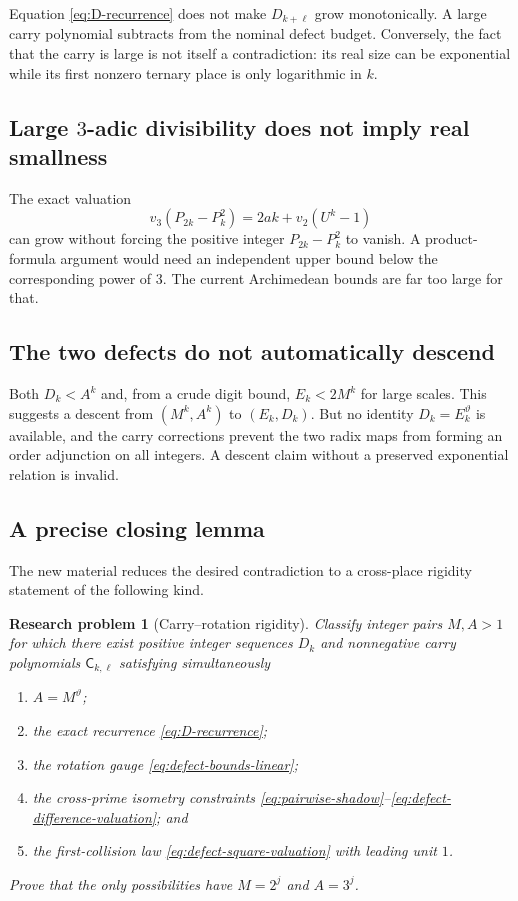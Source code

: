 \documentclass[11pt]{article}
\newtheorem{problem}[theorem]{Research problem}
\theoremstyle{definition}
\theoremstyle{remark}
\newcommand{\vTwo}{v_2}
\newcommand{\vThree}{v_3}
\newcommand{\carry}{\mathsf C}
\newcommand{\thetaAE}{\vartheta}
\begin{document}
Equation \eqref{eq:D-recurrence} does not make $D_{k+\ell}$ grow
monotonically.  A large carry polynomial subtracts from the nominal defect
budget.  Conversely, the fact that the carry is large is not itself a
contradiction: its real size can be exponential while its first nonzero
ternary place is only logarithmic in $k$.

\subsection{Large $3$-adic divisibility does not imply real smallness}

The exact valuation
\[
 \vThree(P_{2k}-P_k^2)=2ak+\vTwo(U^k-1)
\]
can grow without forcing the positive integer $P_{2k}-P_k^2$ to vanish.  A
product-formula argument would need an independent upper bound below the
corresponding power of $3$.  The current Archimedean bounds are far too large
for that.

\subsection{The two defects do not automatically descend}

Both $D_k<A^k$ and, from a crude digit bound, $E_k<2M^k$ for large scales.
This suggests a descent from $(M^k,A^k)$ to $(E_k,D_k)$.  But no identity
$D_k=E_k^{\thetaAE}$ is available, and the carry corrections prevent the two
radix maps from forming an order adjunction on all integers.  A descent claim
without a preserved exponential relation is invalid.

\subsection{A precise closing lemma}

The new material reduces the desired contradiction to a cross-place rigidity
statement of the following kind.

\begin{problem}[Carry--rotation rigidity]\label{prob:closing}
Classify integer pairs $M,A>1$ for which there exist positive integer
sequences $D_k$ and nonnegative carry polynomials $\carry_{k,\ell}$ satisfying
simultaneously
\begin{enumerate}[label=(\roman*)]
\item $A=M^{\thetaAE}$;
\item the exact recurrence \eqref{eq:D-recurrence};
\item the rotation gauge \eqref{eq:defect-bounds-linear};
\item the cross-prime isometry constraints
\eqref{eq:pairwise-shadow}--\eqref{eq:defect-difference-valuation}; and
\item the first-collision law \eqref{eq:defect-square-valuation} with leading
unit $1$.
\end{enumerate}
Prove that the only possibilities have $M=2^j$ and $A=3^j$.
\end{problem}
\end{document}

